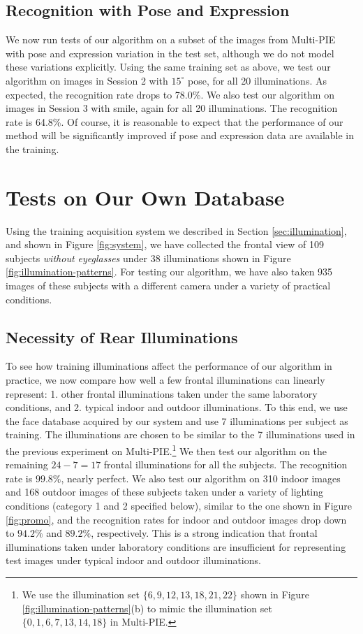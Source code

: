 \documentclass[12pt,journal,draftcls,letterpaper,onecolumn]{IEEEtran}
\begin{document}
\subsection{Recognition with Pose and Expression} We now run tests of
our algorithm on a subset of the images from Multi-PIE with pose and expression variation in the test set, although we do not model these variations explicitly.
Using the same training set as above, we test our algorithm on
images in Session 2 with $15^\circ$ pose, for all 20
illuminations. As expected, the recognition rate drops to 78.0\%. We also test our
algorithm on images in Session 3 with smile, again for all 20
illuminations. The recognition rate is 64.8\%. Of course, it is reasonable to expect that
the performance of our method will be significantly improved if pose and expression data
are available in the training.


\section{Tests on Our Own Database}\label{sec:own-data} Using the training acquisition
system we described in Section \ref{sec:illumination}, and shown in Figure
\ref{fig:system}, we have collected the frontal view of 109
subjects {\em without eyeglasses} under 38 illuminations shown
in Figure \ref{fig:illumination-patterns}. For testing our
algorithm, we have also taken 935 images of these subjects with
a different camera under a variety of practical conditions.

\subsection{Necessity of Rear Illuminations} To see how
training illuminations affect the performance of our algorithm
in practice, we now compare how well a few frontal
illuminations can linearly represent: 1. other frontal illuminations
taken under the same laboratory conditions, and 2. typical
indoor and outdoor illuminations. To this end, we use the face
database acquired by our system and use 7 illuminations per
subject as training. The illuminations are chosen to be similar
to the 7 illuminations used in the previous experiment on
Multi-PIE.\footnote{We use the illumination set $\{6, 9, 12,
13, 18, 21, 22\}$ shown in Figure
\ref{fig:illumination-patterns}(b) to mimic the illumination
set $\{0, 1, 6, 7, 13, 14, 18\}$ in Multi-PIE.} We then test
our algorithm on the remaining $24 - 7 = 17$ frontal
illuminations for all the subjects. The recognition rate is
$99.8\%$, nearly perfect. We also test our algorithm on 310
indoor images and 168 outdoor images of these subjects taken
under a variety of lighting conditions (category 1 and 2
specified below), similar to the one shown in Figure
\ref{fig:promo}, and the recognition rates for indoor and
outdoor images drop down to $94.2\%$ and $89.2\%$,
respectively. This is a strong indication that 
frontal illuminations taken under laboratory conditions
are insufficient for representing test images under typical indoor and
outdoor illuminations.\vspace{-0.2in}
\end{document}
